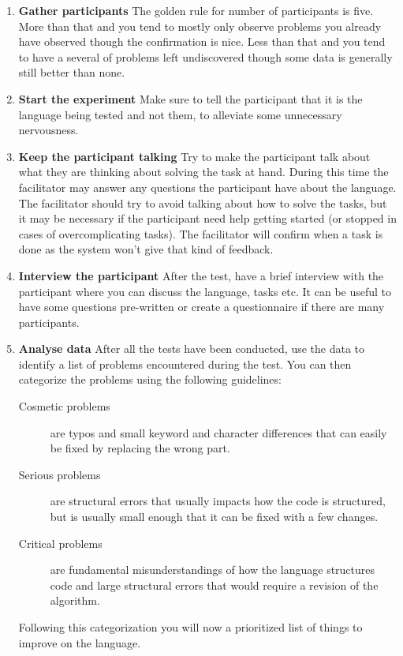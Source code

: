 \begin{enumerate}
\item \textbf{Gather participants} The golden rule for number of participants is five. More than that and you tend to mostly only observe problems you already have observed though the confirmation is nice. Less than that and you tend to have a several of problems left undiscovered though some data is generally still better than none.
\item \textbf{Start the experiment} Make sure to tell the participant that it is the language being tested and not them, to alleviate some unnecessary nervousness.
\item \textbf{Keep the participant talking} Try to make the participant talk about what they are thinking about solving the task at hand. During this time the facilitator may answer any questions the participant have about the language. The facilitator should try to avoid talking about how to solve the tasks, but it may be necessary if the participant need help getting started (or stopped in cases of overcomplicating tasks). The facilitator will confirm when a task is done as the system won't give that kind of feedback.
\item \textbf{Interview the participant} After the test, have a brief interview with the participant where you can discuss the language, tasks etc. It can be useful to have some questions pre-written or create a questionnaire if there are many participants.
\item \textbf{Analyse data} After all the tests have been conducted, use the data to identify a list of problems encountered during the test. You can then categorize the problems using the following guidelines:
\begin{description}
\item[Cosmetic problems] are typos and small keyword and character differences that can easily be fixed by replacing the wrong part.
\item[Serious problems] are structural errors that usually impacts how the code is structured, but is usually small enough that it can be fixed with a few changes.
\item[Critical problems] are fundamental misunderstandings of how the language structures code and large structural errors that would require a revision of the algorithm.
\end{description}
Following this categorization you will now a prioritized list of things to improve on the language.
\end{enumerate}
